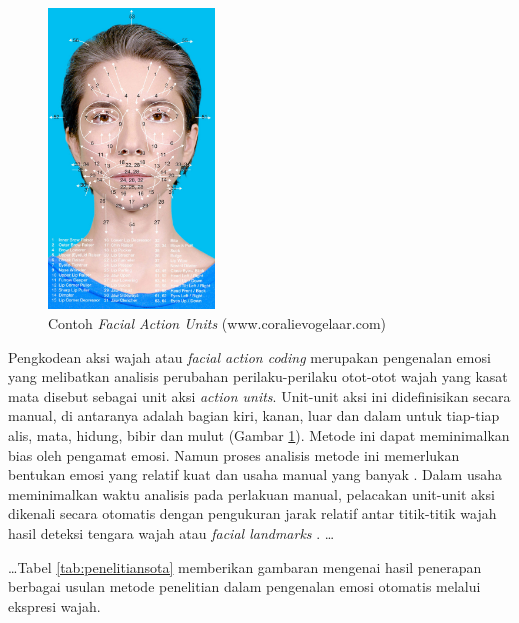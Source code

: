 \begin{figure}
    \centering
    \vspace{-12pt}
    \includegraphics[width=4.425cm]{gambar/facs_coralie_vogelaar.jpg}
    \caption[Contoh \emph{Facial Action Units}]{Contoh \emph{Facial Action Units} (www.coralievogelaar.com)}
    \label{fig:contohfacs}
\end{figure}
Pengkodean aksi wajah atau \emph{facial action coding}  merupakan pengenalan emosi yang melibatkan analisis perubahan perilaku-perilaku otot-otot wajah yang kasat mata disebut sebagai unit aksi \emph{action units}. Unit-unit aksi ini didefinisikan secara manual, di antaranya adalah bagian kiri, kanan, luar dan dalam untuk tiap-tiap alis, mata, hidung, bibir dan mulut (Gambar \ref{fig:contohfacs}). Metode ini dapat meminimalkan bias oleh pengamat emosi. Namun proses analisis metode ini memerlukan bentukan emosi yang relatif kuat dan usaha manual yang banyak . Dalam usaha meminimalkan waktu analisis pada perlakuan manual, pelacakan unit-unit aksi dikenali secara otomatis dengan pengukuran jarak relatif antar titik-titik wajah hasil deteksi tengara wajah atau \emph{facial landmarks} . \dots

\dots Tabel \ref{tab:penelitiansota} memberikan gambaran mengenai hasil penerapan berbagai usulan metode penelitian dalam pengenalan emosi otomatis melalui ekspresi wajah.

